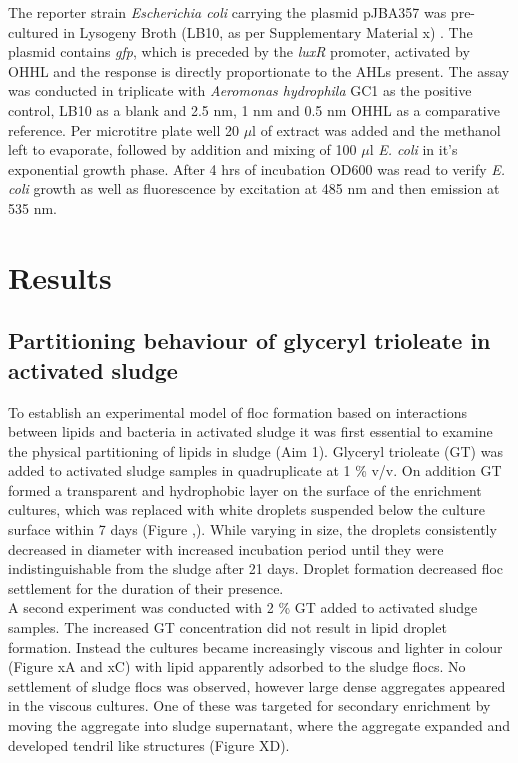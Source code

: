 \documentclass[11pt]{article}
\begin{document}
 The reporter strain \emph{Escherichia coli} carrying the plasmid pJBA357 was pre-cultured in Lysogeny Broth (LB10, as per Supplementary Material x) \cite{bertani1951studies}. The plasmid contains \emph{gfp}, which  is preceded by the \emph{luxR} promoter, activated by OHHL and the response is directly proportionate to the AHLs present.
The assay was conducted in triplicate with \emph{Aeromonas hydrophila} GC1 as the positive control, LB10 as a blank and 2.5 nm, 1 nm and 0.5 nm OHHL as a comparative reference. Per microtitre plate well 20 $\mu$l of extract was added and the methanol left to evaporate, followed by addition and mixing of 100 $\mu$l \emph{E. coli} in it's exponential growth phase. After 4 hrs of incubation OD600 was read to verify \emph{E. coli} growth as well as fluorescence by excitation at 485 nm and then emission at 535 nm.
\newpage
\section{Results}
\subsection{Partitioning behaviour of glyceryl trioleate in activated sludge}

To establish an experimental model of floc formation based on interactions between lipids and bacteria in activated sludge it was first essential to examine the physical partitioning of lipids in sludge (Aim 1). Glyceryl trioleate (GT) was added to activated sludge samples in quadruplicate at 1 \% v/v. On addition GT formed a transparent and hydrophobic layer on the surface of the enrichment cultures, which was replaced with white droplets suspended below the culture surface within 7 days (Figure ,). While varying in size, the droplets consistently decreased in diameter with increased incubation period until they were indistinguishable from the sludge after 21 days. Droplet formation decreased floc settlement for the duration of their presence.\\

A second experiment was conducted with 2 \% GT added to activated sludge samples. The increased GT concentration did not result in lipid droplet formation. Instead the cultures became increasingly viscous and lighter in colour (Figure xA and xC) with lipid apparently adsorbed to the sludge flocs. No settlement of sludge flocs was observed, however large dense aggregates appeared in the viscous cultures. One of these was targeted for secondary enrichment by moving the aggregate into sludge supernatant, where the aggregate expanded and developed tendril like structures (Figure XD).
\end{document}
